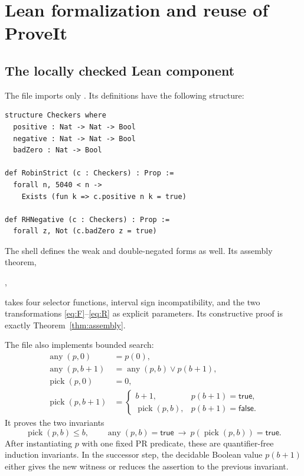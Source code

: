 \section{Lean formalization and reuse of ProveIt}
\label{sec:lean}

\subsection{The locally checked Lean component}

The file  imports only
. Its definitions have the following structure:
\begin{lstlisting}
structure Checkers where
  positive : Nat -> Nat -> Bool
  negative : Nat -> Nat -> Bool
  badZero : Nat -> Bool

def RobinStrict (c : Checkers) : Prop :=
  forall n, 5040 < n ->
    Exists (fun k => c.positive n k = true)

def RHNegative (c : Checkers) : Prop :=
  forall z, Not (c.badZero z = true)
\end{lstlisting}
The shell defines the weak and double-negated forms as well.
Its assembly theorem,
\begin{center}
,
\end{center}
takes four
selector functions, interval sign incompatibility, and the two
transformations \eqref{eq:F}--\eqref{eq:R} as explicit parameters.
Its constructive proof is exactly Theorem~\ref{thm:assembly}.

The file also implements bounded search:
\begin{align*}
 \operatorname{any}(p,0)&=p(0),\\
 \operatorname{any}(p,b+1)&=\operatorname{any}(p,b)\vee p(b+1),\\
 \operatorname{pick}(p,0)&=0,\\
 \operatorname{pick}(p,b+1)&=
 \begin{cases}
 b+1,&p(b+1)=\mathsf{true},\\
 \operatorname{pick}(p,b),&p(b+1)=\mathsf{false}.
 \end{cases}
\end{align*}
It proves the two invariants
\[
 \operatorname{pick}(p,b)\le b,\qquad
 \operatorname{any}(p,b)=\mathsf{true}
 \ \to\ p(\operatorname{pick}(p,b))=\mathsf{true}.
\]
After instantiating $p$ with one fixed PR predicate, these are
quantifier-free induction invariants. In the successor step, the
decidable Boolean value $p(b+1)$ either gives the new witness or
reduces the assertion to the previous invariant.

